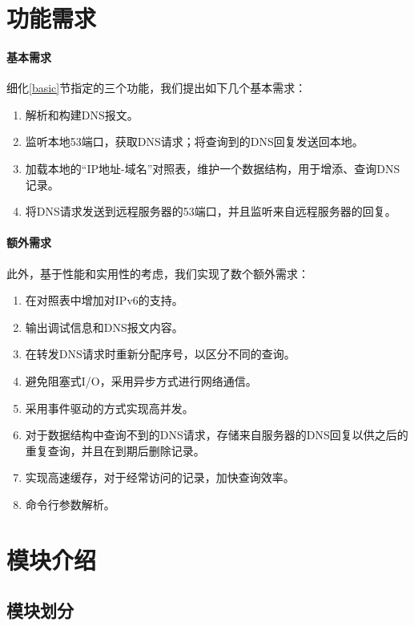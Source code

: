 \documentclass[lang=cn,11pt,a4paper,cite=authornum]{paper}
\begin{document}
\section{功能需求}

\paragraph{基本需求}

细化\ref{basic}节指定的三个功能，我们提出如下几个基本需求：

\begin{enumerate}
    \item 解析和构建DNS报文。
    \item 监听本地53端口，获取DNS请求；将查询到的DNS回复发送回本地。
    \item 加载本地的“IP地址-域名”对照表，维护一个数据结构，用于增添、查询DNS记录。
    \item 将DNS请求发送到远程服务器的53端口，并且监听来自远程服务器的回复。
\end{enumerate}

\paragraph{额外需求}

此外，基于性能和实用性的考虑，我们实现了数个额外需求：

\begin{enumerate}
    \item 在对照表中增加对IPv6的支持。
    \item 输出调试信息和DNS报文内容。
    \item 在转发DNS请求时重新分配序号，以区分不同的查询。
    \item 避免阻塞式I/O，采用异步方式进行网络通信。
    \item 采用事件驱动的方式实现高并发。
    \item 对于数据结构中查询不到的DNS请求，存储来自服务器的DNS回复以供之后的重复查询，并且在到期后删除记录。
    \item 实现高速缓存，对于经常访问的记录，加快查询效率。
    \item 命令行参数解析。
\end{enumerate}

\section{模块介绍}

\subsection{模块划分}
\end{document}
